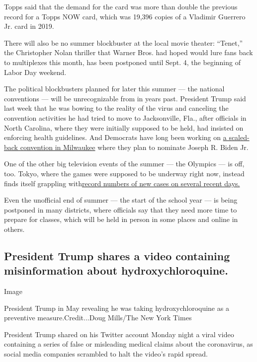Topps said that the demand for the card was more than double the
previous record for a Topps NOW card, which was 19,396 copies of a
Vladimir Guerrero Jr. card in 2019.

There will also be no summer blockbuster at the local movie theater:
``Tenet,'' the Christopher Nolan thriller that Warner Bros. had hoped
would lure fans back to multiplexes this month, has been postponed until
Sept. 4, the beginning of Labor Day weekend.

The political blockbusters planned for later this summer --- the
national conventions --- will be unrecognizable from in years past.
President Trump said last week that he was bowing to the reality of the
virus and canceling the convention activities he had tried to move to
Jacksonville, Fla., after officials in North Carolina, where they were
initially supposed to be held, had insisted on enforcing health
guidelines. And Democrats have long been working on
\href{https://www.nytimes3xbfgragh.onion/2020/07/17/us/politics/democratic-convention-milwaukee.html}{a
scaled-back convention in Milwaukee} where they plan to nominate Joseph
R. Biden Jr.

One of the other big television events of the summer --- the Olympics
--- is off, too. Tokyo, where the games were supposed to be underway
right now, instead finds itself grappling
with\href{https://www.nytimes3xbfgragh.onion/2020/07/24/world/asia/japan-coronavirus.html}{record
numbers of new cases on several recent days.}

Even the unofficial end of summer --- the start of the school year ---
is being postponed in many districts, where officials say that they need
more time to prepare for classes, which will be held in person in some
places and online in others.

\hypertarget{president-trump-shares-a-video-containing-misinformation-about-hydroxychloroquine}{%
\subsection{President Trump shares a video containing misinformation
about
hydroxychloroquine.}\label{president-trump-shares-a-video-containing-misinformation-about-hydroxychloroquine}}

Image

President Trump in May revealing he was taking hydroxychloroquine as a
preventive measure.Credit...Doug Mills/The New York Times

President Trump shared on his Twitter account Monday night a viral video
containing a series of false or misleading medical claims about the
coronavirus, as social media companies scrambled to halt the video's
rapid spread.


